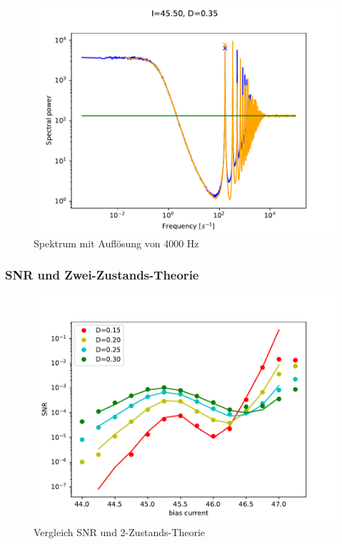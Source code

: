 \documentclass[12pt,a4paper]{article}
\begin{document}
\begin{figure}[H]
	\centering
	\includegraphics[scale=1]{freq4000.pdf}\caption{Spektrum mit Auflösung von 4000 Hz}
	\label{freq4000}
\end{figure}
\subsubsection{SNR und Zwei-Zustands-Theorie}
\begin{figure}[H]
	\centering
	\includegraphics[scale=1]{snrtwostateanhopf3m.pdf}\caption{Vergleich SNR und 2-Zustands-Theorie}
	\label{snrtwostateanhopf}
\end{figure}
\end{document}
